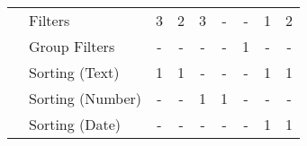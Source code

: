 \begin{table}[tb]
\begin{tabular}{|l|l|c|c|c|c|c|c|c|}
                                                                                                                               & Filters                                                                  & 3                                          & 2                                & 3                                          & -                                          & -                                & 1                                          & 2                                \\ \cline{2-9} 
                                                                                                                               & Group Filters                                                            & -                                          & -                                & -                                          & -                                          & 1                                & -                                          & -                                \\ \cline{2-9} 
                                                                                                                               & Sorting (Text)                                                           & 1                                          & 1                                & -                                          & -                                          & -                                & 1                                          & 1                                \\ \cline{2-9} 
                                                                                                                               & Sorting (Number)                                                         & -                                          & -                                & 1                                          & 1                                          & -                                & -                                          & -                                \\ \cline{2-9} 
                                                                                                                               & Sorting (Date)                                                           & -                                          & -                                & -                                          & -                                          & -                                & 1                                          & 1                                \\ \cline{2-9} 

\end{tabular}
\end{table}
